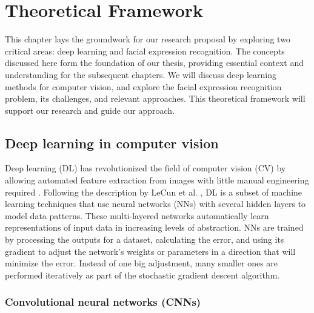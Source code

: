 \documentclass[../main.tex]{subfiles}
\begin{document}
\chapter{Theoretical Framework}

This chapter lays the groundwork for our research proposal by exploring two critical areas: deep learning and facial expression recognition. 
The concepts discussed here form the foundation of our thesis, providing essential context and understanding for the subsequent chapters. 
We will discuss deep learning methods for computer vision, and explore the facial expression recognition problem, its challenges, and relevant approaches. 
This theoretical framework will support our research and guide our approach.
\newpage

\section{Deep learning in computer vision} 

Deep learning (DL) has revolutionized the field of computer vision (CV) by allowing automated feature extraction from images with little manual engineering required \cite{lecun2015dl}.
Following the description by LeCun et al. \cite{lecun2015dl}, DL is a subset of machine learning techniques that use neural networks (NNs) with several hidden layers to model data patterns.
These multi-layered networks automatically learn representations of input data in increasing levels of abstraction.
NNs are trained by processing the outputs for a dataset, calculating the error, and using its gradient to adjust the network's weights or parameters
in a direction that will minimize the error.
Instead of one big adjustment, many smaller ones are performed iteratively as part of the stochastic gradient descent algorithm.\\



\subsection{Convolutional neural networks (CNNs)}
\end{document}
